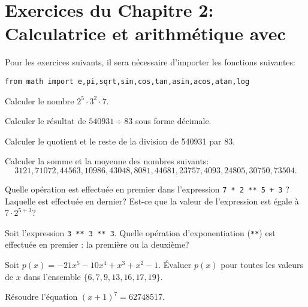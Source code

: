 
\section*{Exercices du Chapitre 2: Calculatrice et arithmétique avec \python}

Pour les exercices suivants, il sera nécessaire d'importer les fonctions
suivantes:
\begin{verbatim}
from math import e,pi,sqrt,sin,cos,tan,asin,acos,atan,log
\end{verbatim}

\begin{exercice}
Calculer le nombre $2^5\cdot 3^2\cdot 7$.
\end{exercice}

\begin{exercice}
Calculer le résultat de $540931 \div 83$ sous forme décimale.
\end{exercice}

\begin{exercice}
Calculer le quotient et le reste de la division de 540931 par 83.
\end{exercice}

\begin{exercice}
Calculer la somme et la moyenne des nombres suivants: 
\[
    3121, 71072, 44563, 10986, 43048, 8081, 44681, 23757, 4093, 24805, 30750,
    73504.
\]
\end{exercice}

\begin{exercice}
    Quelle opération est effectuée en premier dans l'expression
    \texttt{7 * 2 ** 5 + 3} ? Laquelle est effectuée en dernier?
    Est-ce que la valeur de l'expression est égale à $7\cdot 2^{5+3}$?
\end{exercice}

\begin{exercice}
    Soit l'expression \texttt{3 ** 3 ** 3}. 
    Quelle opération d'exponentiation (\texttt{**}) est effectuée en premier :
    la première ou la deuxième?
\end{exercice}

\begin{exercice}
    Soit $p(x)= -21x^{5} - 10x^{4} + x^{3} + x^{2} - 1$. Évaluer $p(x)$ pour
    toutes les valeurs de $x$ dans l'ensemble $\{6, 7, 9, 13, 16, 17, 19\}$.
\end{exercice}

\begin{exercice}
    Résoudre l'équation $(x+1)^7=62748517$.
\end{exercice}

